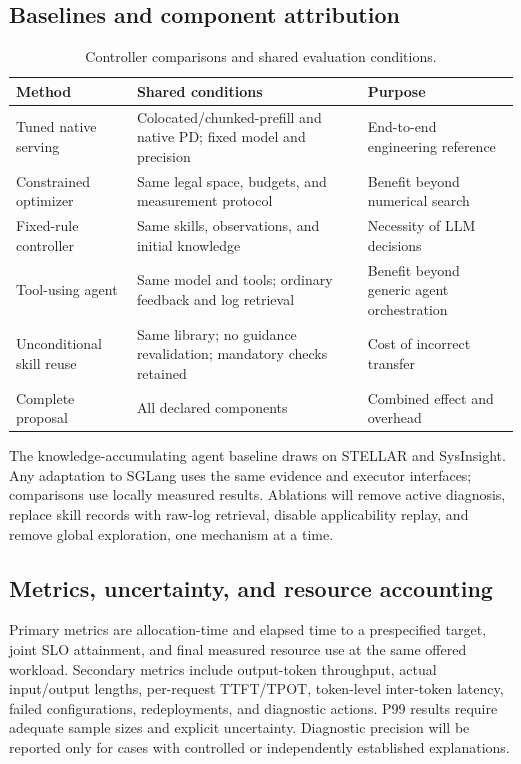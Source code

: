 \documentclass[11pt,a4paper]{article}
\begin{document}
\subsection{Baselines and component attribution}
\begin{table}[H]
\centering\small
\begin{tabularx}{\linewidth}{@{}>{\raggedright\arraybackslash}p{36mm}YY@{}}
\toprule
Method & Shared conditions & Purpose \\
\midrule
Tuned native serving & Colocated/chunked-prefill and native PD; fixed model and precision & End-to-end engineering reference \\
Constrained optimizer & Same legal space, budgets, and measurement protocol & Benefit beyond numerical search \\
Fixed-rule controller & Same skills, observations, and initial knowledge & Necessity of LLM decisions \\
Tool-using agent & Same model and tools; ordinary feedback and log retrieval & Benefit beyond generic agent orchestration \\
Unconditional skill reuse & Same library; no guidance revalidation; mandatory checks retained & Cost of incorrect transfer \\
Complete proposal & All declared components & Combined effect and overhead \\
\bottomrule
\end{tabularx}
\caption{Controller comparisons and shared evaluation conditions.}
\end{table}

The knowledge-accumulating agent baseline draws on STELLAR and SysInsight. Any adaptation to SGLang uses the same evidence and executor interfaces; comparisons use locally measured results. Ablations will remove active diagnosis, replace skill records with raw-log retrieval, disable applicability replay, and remove global exploration, one mechanism at a time.

\subsection{Metrics, uncertainty, and resource accounting}
Primary metrics are allocation-time and elapsed time to a prespecified target, joint SLO attainment, and final measured resource use at the same offered workload. Secondary metrics include output-token throughput, actual input/output lengths, per-request TTFT/TPOT, token-level inter-token latency, failed configurations, redeployments, and diagnostic actions. P99 results require adequate sample sizes and explicit uncertainty. Diagnostic precision will be reported only for cases with controlled or independently established explanations.
\end{document}
